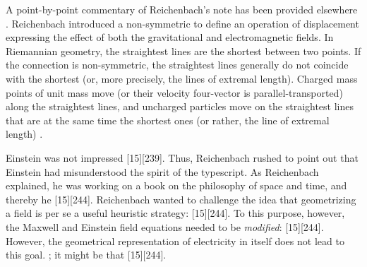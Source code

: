 \documentclass[final]{article}
\begin{document}
A point-by-point commentary of Reichenbach's note has been provided elsewhere \citep{Giovanelli2016d}. Reichenbach introduced a non-symmetric \Gtmn to define an operation of displacement expressing the effect of both the gravitational and electromagnetic fields. In Riemannian geometry, the straightest lines are the shortest between two points. If the connection is non-symmetric, the straightest lines generally do not coincide with the shortest (or, more precisely, the lines of extremal length). Charged mass points of unit mass move (or their velocity four-vector is parallel-transported) along the straightest lines, and uncharged particles move on the straightest lines that are at the same time the shortest ones (or rather, the line of extremal length) \citep{Reichenbach1926f}.

Einstein was not impressed [15][239].  Thus, Reichenbach rushed to point out that Einstein had misunderstood the spirit of the typescript. As Reichenbach explained, he was working on a book on the philosophy of space and time, and thereby he  [15][244].  Reichenbach wanted to challenge the idea that geometrizing a field is per se a useful heuristic strategy:  [15][244]. To this purpose, however, the  Maxwell and Einstein field equations needed to be  \emph{modified}:  [15][244]. However, the geometrical representation of electricity in itself does not lead to this goal. ; it might be that  [15][244]. 
\end{document}

